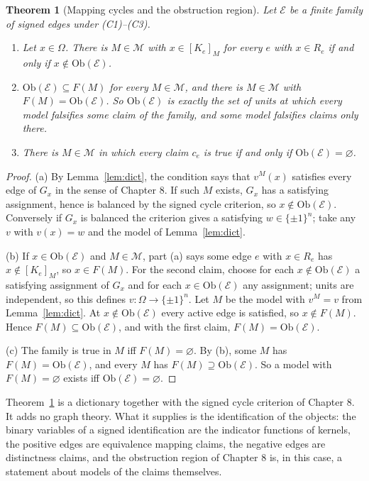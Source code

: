 \documentclass[11pt]{article}
\theoremstyle{plain}
\newtheorem{theorem}{Theorem}
\theoremstyle{definition}
\theoremstyle{remark}
\newcommand{\Om}{\Omega}
\newcommand{\Ob}{\mathrm{Ob}}
\newcommand{\ext}[2]{[#1]_{#2}}
\begin{document}
\begin{theorem}[Mapping cycles and the obstruction region]\label{thm:main}
Let $\mathcal E$ be a finite family of signed edges under (C1)--(C3).
\begin{enumerate}[label=(\alph*)]
\item Let $x\in\Om$. There is $M\in\mathcal M$ with $x\in\ext{K_e}{M}$ for every $e$ with $x\in R_e$ if and only if $x\notin\Ob(\mathcal E)$.
\item $\Ob(\mathcal E)\subseteq F(M)$ for every $M\in\mathcal M$, and there is $M\in\mathcal M$ with $F(M)=\Ob(\mathcal E)$. So $\Ob(\mathcal E)$ is exactly the set of units at which every model falsifies some claim of the family, and some model falsifies claims only there.
\item There is $M\in\mathcal M$ in which every claim $c_e$ is true if and only if $\Ob(\mathcal E)=\varnothing$.
\end{enumerate}
\end{theorem}

\begin{proof}
(a) By Lemma~\ref{lem:dict}, the condition says that $v^M(x)$ satisfies every edge of $G_x$ in the sense of Chapter 8. If such $M$ exists, $G_x$ has a satisfying assignment, hence is balanced by the signed cycle criterion, so $x\notin\Ob(\mathcal E)$. Conversely if $G_x$ is balanced the criterion gives a satisfying $w\in\{\pm1\}^n$; take any $v$ with $v(x)=w$ and the model of Lemma~\ref{lem:dict}.

(b) If $x\in\Ob(\mathcal E)$ and $M\in\mathcal M$, part (a) says some edge $e$ with $x\in R_e$ has $x\notin\ext{K_e}{M}$, so $x\in F(M)$. For the second claim, choose for each $x\notin\Ob(\mathcal E)$ a satisfying assignment of $G_x$ and for each $x\in\Ob(\mathcal E)$ any assignment; units are independent, so this defines $v:\Om\to\{\pm1\}^n$. Let $M$ be the model with $v^M=v$ from Lemma~\ref{lem:dict}. At $x\notin\Ob(\mathcal E)$ every active edge is satisfied, so $x\notin F(M)$. Hence $F(M)\subseteq\Ob(\mathcal E)$, and with the first claim, $F(M)=\Ob(\mathcal E)$.

(c) The family is true in $M$ iff $F(M)=\varnothing$. By (b), some $M$ has $F(M)=\Ob(\mathcal E)$, and every $M$ has $F(M)\supseteq\Ob(\mathcal E)$. So a model with $F(M)=\varnothing$ exists iff $\Ob(\mathcal E)=\varnothing$.
\end{proof}

Theorem~\ref{thm:main} is a dictionary together with the signed cycle criterion of Chapter 8. It adds no graph theory. What it supplies is the identification of the objects: the binary variables of a signed identification are the indicator functions of kernels, the positive edges are equivalence mapping claims, the negative edges are distinctness claims, and the obstruction region of Chapter 8 is, in this case, a statement about models of the claims themselves.
\end{document}
